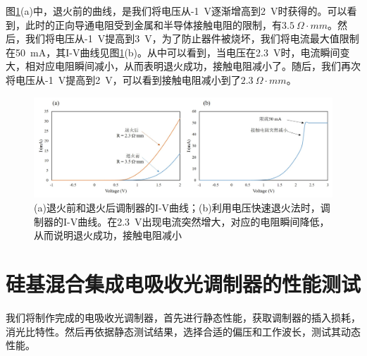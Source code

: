图\ref{chapt4_3D_resist}(a)中，退火前的曲线，是我们将电压从-1~V逐渐增高到2~V时获得的。可以看到，此时的正向导通电阻受到金属和半导体接触电阻的限制，有$3.5~ \Omega \cdot mm$。然后，我们将电压从-1~V提高到3~V，为了防止器件被烧坏，我们将电流最大值限制在50~mA，其I-V曲线见图\ref{chapt4_3D_resist}(b)。从中可以看到，当电压在2.3~V时，电流瞬间变大，相对应电阻瞬间减小，从而表明退火成功，接触电阻减小了。随后，我们再次将电压从-1~V提高到2~V，可以看到接触电阻减小到了$2.3~ \Omega \cdot mm$。
\begin{figure}[htb]
	\centering
	\includegraphics[width=15cm]{./Pictures/chapt4_3D_resist.jpg}
	\caption{(a)退火前和退火后调制器的I-V曲线；(b)利用电压快速退火法时，调制器的I-V曲线。在2.3~V出现电流突然增大，对应的电阻瞬间降低，从而说明退火成功，接触电阻减小}
	\label{chapt4_3D_resist}
\end{figure}
\section{硅基混合集成电吸收光调制器的性能测试}
我们将制作完成的电吸收光调制器，首先进行静态性能，获取调制器的插入损耗，消光比特性。然后再依据静态测试结果，选择合适的偏压和工作波长，测试其动态性能。
